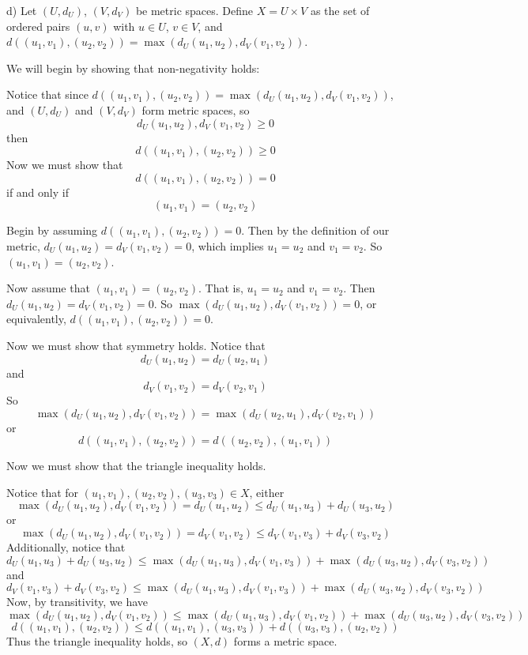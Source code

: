 \documentclass{article}
\begin{document}
\begin{enumerate}
    d) Let $(U, d_U)$, $(V, d_V)$ be metric spaces. Define $X = U \times V$ as the set of ordered pairs $(u, v)$ with $u \in U$, $v \in V$, and $d((u_1,v_1), (u_2,v_2)) = \max(d_U(u_1,u_2), d_V(v_1,v_2))$.
    
    We will begin by showing that non-negativity holds:
    
    Notice that since $d((u_1, v_1), (u_2, v_2)) = \max(d_U(u_1,u_2), d_V(v_1,v_2))$, and $(U, d_U)$ and $(V, d_V)$ form metric spaces, so 
    \[d_U(u_1,u_2), d_V(v_1,v_2) \geq 0\]
    then
    \[d((u_1, v_1), (u_2, v_2)) \geq 0\] 
    Now we must show that 
    \[d((u_1,v_1), (u_2,v_2)) = 0\] 
    if and only if
    \[(u_1, v_1) = (u_2, v_2)\] 
    
    Begin by assuming $d((u_1,v_1), (u_2,v_2)) = 0$. Then by the definition of our metric, $d_U(u_1,u_2) = d_V(v_1,v_2) = 0$, which implies $u_1 = u_2$ and $v_1 = v_2$. So $(u_1,v_1) = (u_2,v_2)$.
    
    Now assume that $(u_1, v_1) = (u_2, v_2)$. That is, $u_1 = u_2$ and $v_1 = v_2$. Then $d_U(u_1, u_2) = d_V(v_1, v_2) = 0$. So $\max(d_U(u_1,u_2), d_V(v_1,v_2)) = 0$, or equivalently, $d((u_1,v_1),(u_2,v_2)) = 0$.
    \newline
    
    Now we must show that symmetry holds. Notice that 
    \[d_U(u_1, u_2) = d_U(u_2, u_1)\] 
    and 
    \[d_V(v_1, v_2) = d_V(v_2, v_1)\] 
    So 
    \[\max(d_U(u_1, u_2), d_V(v_1, v_2)) = \max(d_U(u_2, u_1), d_V(v_2, v_1))\] 
    or 
    \[d((u_1, v_1), (u_2, v_2)) = d((u_2, v_2), (u_1, v_1))\]
    
    Now we must show that the triangle inequality holds. 
    
    Notice that for $(u_1, v_1), (u_2, v_2), (u_3, v_3) \in X$, either
    \[\max(d_U(u_1,u_2), d_V(v_1, v_2)) = d_U(u_1, u_2) \leq d_U(u_1, u_3) + d_U(u_3, u_2)\]
    or
    \[\max(d_U(u_1, u_2), d_V(v_1, v_2)) = d_V(v_1, v_2) \leq d_V(v_1, v_3) + d_V(v_3, v_2)\]
    Additionally, notice that 
    \[d_U(u_1, u_3) + d_U(u_3, u_2) \leq \max(d_U(u_1,u_3), d_V(v_1, v_3)) + \max(d_U(u_3, u_2), d_V(v_3,v_2))\]
    and
    \[d_V(v_1, v_3) + d_V(v_3, v_2) \leq \max(d_U(u_1, u_3), d_V(v_1, v_3)) + \max(d_U(u_3, u_2), d_V(v_3, v_2))\]
    Now, by transitivity, we have
    \[\max(d_U(u_1, u_2), d_V(v_1,v_2)) \leq \max(d_U(u_1, u_3), d_V(v_1, v_2)) + \max(d_U(u_3, u_2), d_V(v_3,v_2))\]
    \[d((u_1,v_1),(u_2,v_2)) \leq d((u_1,v_1), (u_3,v_3)) + d((u_3, v_3), (u_2, v_2))\]
    Thus the triangle inequality holds, so $(X,d)$ forms a metric space.
    

\end{enumerate}
\end{document}
